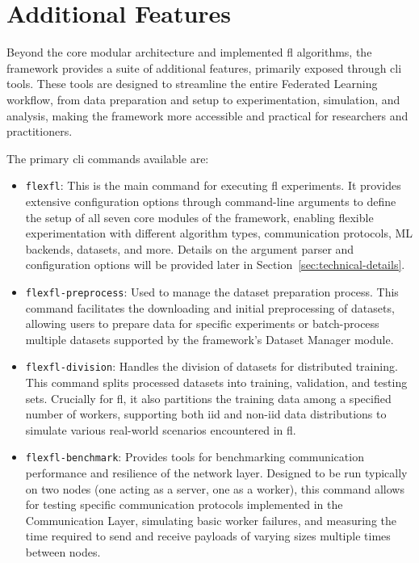 \section{Additional Features}
\label{sec:additional-features}

Beyond the core modular architecture and implemented \ac{fl} algorithms, the framework provides a suite of additional features, primarily exposed through \ac{cli} tools. These tools are designed to streamline the entire Federated Learning workflow, from data preparation and setup to experimentation, simulation, and analysis, making the framework more accessible and practical for researchers and practitioners. 

The primary \ac{cli} commands available are:

\begin{itemize}
    \item \texttt{flexfl}: This is the main command for executing \ac{fl} experiments. It provides extensive configuration options through command-line arguments to define the setup of all seven core modules of the framework, enabling flexible experimentation with different algorithm types, communication protocols, ML backends, datasets, and more. Details on the argument parser and configuration options will be provided later in Section~\ref{sec:technical-details}.
    \item \texttt{flexfl-preprocess}: Used to manage the dataset preparation process. This command facilitates the downloading and initial preprocessing of datasets, allowing users to prepare data for specific experiments or batch-process multiple datasets supported by the framework's Dataset Manager module.
    \item \texttt{flexfl-division}: Handles the division of datasets for distributed training. This command splits processed datasets into training, validation, and testing sets. Crucially for \ac{fl}, it also partitions the training data among a specified number of workers, supporting both \ac{iid} and \ac{non-iid} data distributions to simulate various real-world scenarios encountered in \ac{fl}.
    \item \texttt{flexfl-benchmark}: Provides tools for benchmarking communication performance and resilience of the network layer. Designed to be run typically on two nodes (one acting as a server, one as a worker), this command allows for testing specific communication protocols implemented in the Communication Layer, simulating basic worker failures, and measuring the time required to send and receive payloads of varying sizes multiple times between nodes.

\end{itemize}
